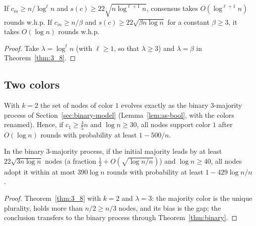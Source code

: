 \begin{corollary}\label{cor:3_11}
  \leanok
  If $c_m \ge n/\log^\ell n$ and $s(c) \ge 22\sqrt{n\log^{\ell+1}n}$,
  consensus takes $O(\log^{\ell+1} n)$ rounds w.h.p. If $c_m \ge n/\beta$
  and $s(c) \ge 22\sqrt{\beta n\log n}$ for a constant $\beta \ge 3$, it
  takes $O(\log n)$ rounds w.h.p.
\end{corollary}

\begin{proof}
  \leanok
  Take $\lambda = \log^\ell n$ (with $\ell \ge 1$, so that $\lambda \ge 3$)
  and $\lambda = \beta$ in Theorem~\ref{thm:3_8}.
\end{proof}

\subsection{Two colors}

\begin{theorem}\label{thm:binary}
  \leanok
  With $k = 2$ the set of nodes of color $1$ evolves exactly as the binary
  3-majority process of Section~\ref{sec:binary-model} (Lemma~\ref{lem:as-bool}, with the colors
  renamed). Hence, if
  $c_1 \ge \frac35 n$ and $\log n \ge 30$, all nodes support color $1$ after
  $O(\log n)$ rounds with probability at least $1 - 500/n$.
\end{theorem}

\begin{corollary}\label{cor:binary_vanishing}
  \leanok
  In the binary 3-majority process, if the initial majority leads by at least
  $22\sqrt{3n\log n}$ nodes (a fraction $\frac12 + O(\sqrt{\log n/n})$) and $\log n \ge 40$,
  all nodes adopt it within at most $390\log n$ rounds with probability at least
  $1 - 429\log n/n$.
\end{corollary}
\begin{proof}
  \leanok
  Theorem~\ref{thm:3_8} with $k = 2$ and $\lambda = 3$: the majority color is the unique
  plurality, holds more than $n/2 \ge n/3$ nodes, and its bias is the gap; the conclusion
  transfers to the binary process through Theorem~\ref{thm:binary}.
\end{proof}

